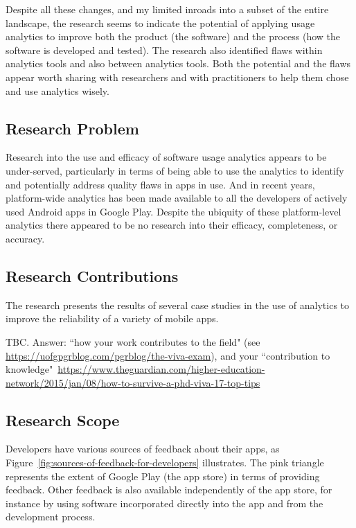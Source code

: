 Despite all these changes, and my limited inroads into a subset of the entire landscape, the research seems to indicate the potential of applying usage analytics to improve both the product (the software) and the process (how the software is developed and tested). The research also identified flaws within analytics tools and also between analytics tools. Both the potential and the flaws appear worth sharing with researchers and with practitioners to help them chose and use analytics wisely.


\subsection{Research Problem}
Research into the use and efficacy of software usage analytics appears to be under-served, particularly in terms of being able to use the analytics to identify and potentially address quality flaws in apps in use. And in recent years, platform-wide analytics has been made available to all the developers of actively used Android apps in Google Play. Despite the ubiquity of these platform-level analytics there appeared to be no research into their efficacy, completeness, or accuracy.


\subsection{Research Contributions}
The research presents the results of several case studies in the use of analytics to improve the reliability of a variety of mobile apps.

TBC. Answer: ``how your work contributes to the field" (see \url{https://uofgpgrblog.com/pgrblog/the-viva-exam}), and your ``contribution to knowledge"~\url{https://www.theguardian.com/higher-education-network/2015/jan/08/how-to-survive-a-phd-viva-17-top-tips}

\subsection{Research Scope}
Developers have various sources of feedback about their apps, as Figure~\ref{fig:sources-of-feedback-for-developers} illustrates. The pink triangle represents the extent of Google Play (the app store) in terms of providing feedback. Other feedback is also available independently of the app store, for instance by using software incorporated directly into the app and from the development process.

